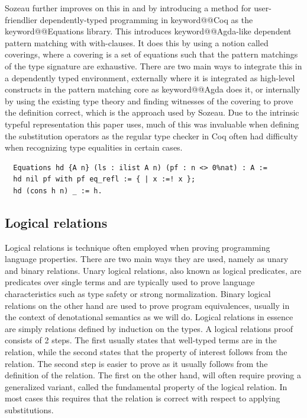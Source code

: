 \documentclass[12pt, final]{article}
\makeatletter
\def\<#1>{\csname keyword@@#1\endcsname}
\makeatother
\begin{document}
Sozeau further improves on this in \cite{Sozeau2010} and \cite{Sozeau2019} by introducing a method for user-friendlier dependently-typed programming in \<Coq> as the \<Equations> library.
This introduces \<Agda>-like dependent pattern matching with with-clauses.
It does this by using a notion called coverings, where a covering is a set of equations such that the pattern matchings of the type signature are exhaustive.
There are two main ways to integrate this in a dependently typed environment, externally where it is integrated as high-level constructs in the pattern matching core as \<Agda> does it, or internally by using the existing type theory and finding witnesses of the covering to prove the definition correct, which is the approach used by Sozeau.
Due to the intrinsic typeful representation this paper uses, much of this was invaluable when defining the substitution operators as the regular type checker in Coq often had difficulty when recognizing type equalities in certain cases.

\begin{listing}
  \begin{verbatim}
  Equations hd {A n} (ls : ilist A n) (pf : n <> 0%nat) : A :=
  hd nil pf with pf eq_refl := { | x :=! x };
  hd (cons h n) _ := h.
  \end{verbatim}
  \caption{Definition of hd using \<Equations>}
  \label{lst:dt_ilist_hd_equations}
\end{listing}


\subsection{Logical relations}

Logical relations is technique often employed when proving programming language properties\cite{skorstengaard2019introduction}. There are two main ways they are used, namely as unary and binary relations.
Unary logical relations, also known as logical predicates, are predicates over single terms and are typically used to prove language characteristics such as type safety or strong normalization.
Binary logical relations on the other hand are used to prove program equivalences, usually in the context of denotational semantics as we will do.
Logical relations in essence are simply relations defined by induction on the types. A logical relations proof consists of 2 steps.
The first usually states that well-typed terms are in the relation, while the second states that the property of interest follows from the relation.
The second step is easier to prove as it usually follows from the definition of the relation. The first on the other hand, will often require proving a generalized variant, called the fundamental property of the logical relation.
In most cases this requires that the relation is correct with respect to applying substitutions.
\end{document}
